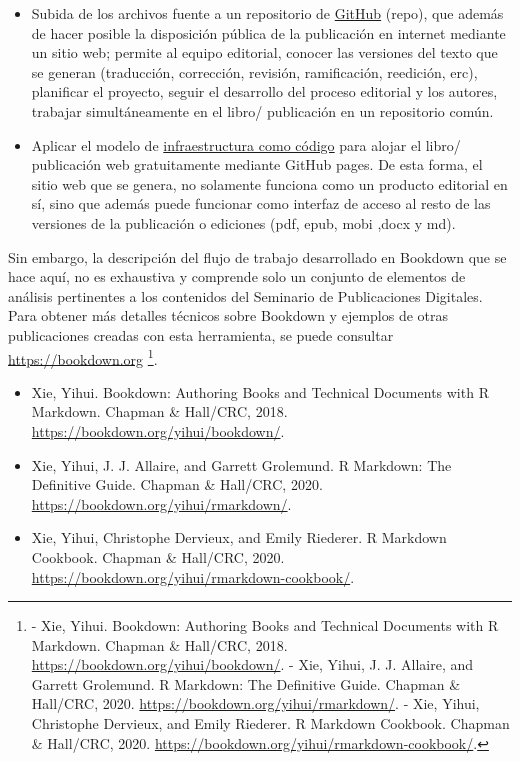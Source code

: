 \documentclass[
]{book}
\begin{document}
\begin{itemize}
\item
  Subida de los archivos fuente a un repositorio de \href{https://github.com/}{GitHub} (repo), que además de hacer posible la disposición pública de la publicación en internet mediante un sitio web; permite al equipo editorial, conocer las versiones del texto que se generan (traducción, corrección, revisión, ramificación, reedición, erc), planificar el proyecto, seguir el desarrollo del proceso editorial y los autores, trabajar simultáneamente en el libro/ publicación en un repositorio común.
\item
  Aplicar el modelo de \href{https://docs.microsoft.com/es-es/devops/deliver/what-is-infrastructure-as-code}{infraestructura como código} para alojar el libro/ publicación web gratuitamente mediante GitHub pages. De esta forma, el sitio web que se genera, no solamente funciona como un producto editorial en sí, sino que además puede funcionar como interfaz de acceso al resto de las versiones de la publicación o ediciones (pdf, epub, mobi ,docx y md).
\end{itemize}

Sin embargo, la descripción del flujo de trabajo desarrollado en Bookdown que se hace aquí, no es exhaustiva y comprende solo un conjunto de elementos de análisis pertinentes a los contenidos del Seminario de Publicaciones Digitales. Para obtener más detalles técnicos sobre Bookdown y ejemplos de otras publicaciones creadas con esta herramienta, se puede consultar \url{https://bookdown.org} \footnote{- Xie, Yihui. Bookdown: Authoring Books and Technical Documents with R Markdown. Chapman \& Hall/CRC, 2018. \url{https://bookdown.org/yihui/bookdown/}. - Xie, Yihui, J. J. Allaire, and Garrett Grolemund. R Markdown: The Definitive Guide. Chapman \& Hall/CRC, 2020. \url{https://bookdown.org/yihui/rmarkdown/}. - Xie, Yihui, Christophe Dervieux, and Emily Riederer. R Markdown Cookbook. Chapman \& Hall/CRC, 2020. \url{https://bookdown.org/yihui/rmarkdown-cookbook/}.}.

\begin{itemize}
\item
  Xie, Yihui. Bookdown: Authoring Books and Technical Documents with R Markdown. Chapman \& Hall/CRC, 2018. \url{https://bookdown.org/yihui/bookdown/}.
\item
  Xie, Yihui, J. J. Allaire, and Garrett Grolemund. R Markdown: The Definitive Guide. Chapman \& Hall/CRC, 2020. \url{https://bookdown.org/yihui/rmarkdown/}.
\item
  Xie, Yihui, Christophe Dervieux, and Emily Riederer. R Markdown Cookbook. Chapman \& Hall/CRC, 2020. \url{https://bookdown.org/yihui/rmarkdown-cookbook/}.
\end{itemize}
\end{document}

